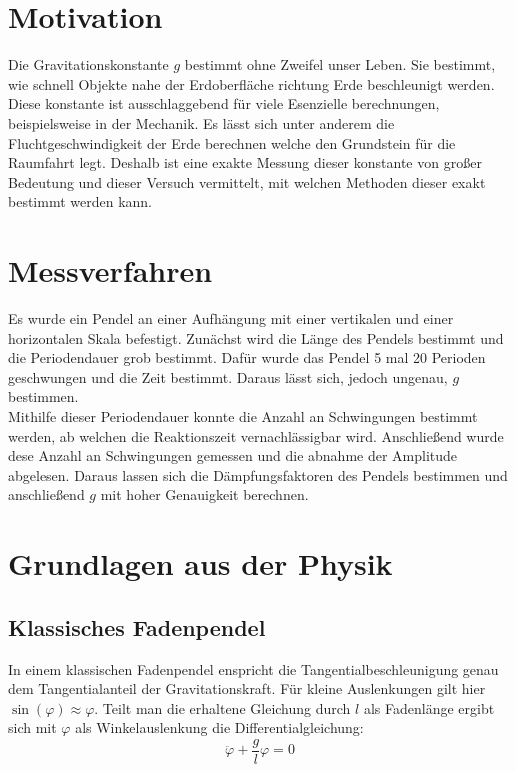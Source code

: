 \section{Motivation}

Die Gravitationskonstante $g$ bestimmt ohne Zweifel unser Leben.
Sie bestimmt, wie schnell Objekte nahe der Erdoberfläche richtung Erde beschleunigt werden.
Diese konstante ist ausschlaggebend für viele Esenzielle berechnungen, beispielsweise in der Mechanik.
Es lässt sich unter anderem die Fluchtgeschwindigkeit der Erde berechnen welche den Grundstein für
die Raumfahrt legt. Deshalb ist eine exakte Messung dieser konstante von großer Bedeutung und dieser Versuch
vermittelt, mit welchen Methoden dieser exakt bestimmt werden kann.


\section{Messverfahren}
Es wurde ein Pendel an einer Aufhängung mit einer vertikalen und einer horizontalen Skala befestigt.
Zunächst wird die Länge des Pendels bestimmt und die Periodendauer grob bestimmt.
Dafür wurde das Pendel 5 mal 20 Perioden geschwungen und die Zeit bestimmt.
Daraus lässt sich, jedoch ungenau, $g$ bestimmen.\\
Mithilfe dieser Periodendauer konnte die Anzahl an Schwingungen bestimmt werden,
ab welchen die Reaktionszeit vernachlässigbar wird.
Anschließend wurde dese Anzahl an Schwingungen gemessen und die abnahme der Amplitude abgelesen.
Daraus lassen sich die Dämpfungsfaktoren des Pendels bestimmen und anschließend $g$ mit hoher Genauigkeit berechnen.

\section{Grundlagen aus der Physik}

\subsection{Klassisches Fadenpendel}
In einem klassischen Fadenpendel enspricht die Tangentialbeschleunigung genau dem Tangentialanteil der Gravitationskraft.
Für kleine Auslenkungen gilt hier $\sin(\varphi) \approx \varphi$.
Teilt man die erhaltene Gleichung durch $l$ als Fadenlänge ergibt sich mit $\varphi$ als Winkelauslenkung die Differentialgleichung:
\begin{equation}
    \ddot{\varphi} + \frac{g}{l} \varphi = 0
    \label{eq:ho}
\end{equation}

